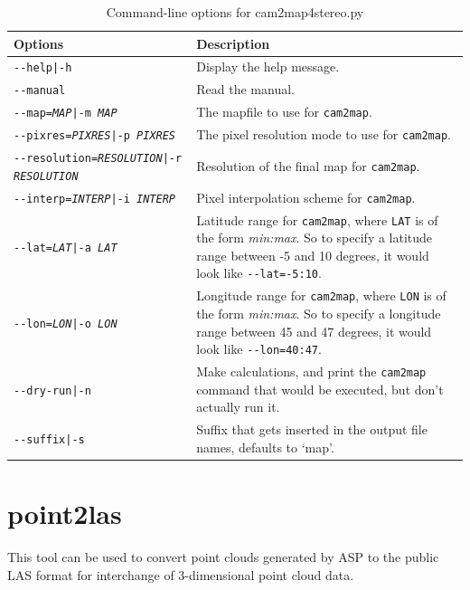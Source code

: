 \begin{longtable}{|l|p{10cm}|}
\caption{Command-line options for cam2map4stereo.py}
\label{tbl:bundlevis}
\endfirsthead
\endhead
\endfoot
\endlastfoot
\hline
Options & Description \\ \hline \hline
\texttt{-\/-help|-h} & Display the help message. \\ \hline
\texttt{-\/-manual} & Read the manual. \\ \hline
\texttt{-\/-map=\textit{MAP}|-m \textit{MAP}} & The mapfile to use for \texttt{cam2map}. \\ \hline
\texttt{-\/-pixres=\textit{PIXRES}|-p \textit{PIXRES}} & The pixel resolution mode to use for \texttt{cam2map}. \\ \hline
\texttt{-\/-resolution=\textit{RESOLUTION}|-r \textit{RESOLUTION}} & Resolution of the final map for \texttt{cam2map}. \\ \hline
\texttt{-\/-interp=\textit{INTERP}|-i \textit{INTERP}} & Pixel interpolation scheme for \texttt{cam2map}. \\ \hline
\texttt{-\/-lat=\textit{LAT}|-a \textit{LAT}} & Latitude range for \texttt{cam2map}, where \texttt{LAT} is of the form \textit{min:max}.  So to specify a latitude range between -5 and 10 degrees, it would look like \texttt{-\/-lat=-5:10}. \\ \hline
\texttt{-\/-lon=\textit{LON}|-o \textit{LON}} & Longitude range for \texttt{cam2map}, where \texttt{LON} is of the form \textit{min:max}.  So to specify a longitude range between 45 and 47 degrees, it would look like \texttt{-\/-lon=40:47}. \\ \hline
\texttt{-\/-dry-run|-n} & Make calculations, and print the \texttt{cam2map} command that would be executed, but don't actually run it.\\ \hline
\texttt{-\/-suffix|-s} & Suffix that gets inserted in the output file names, defaults to `map'.\\ \hline
\end{longtable}

\clearpage

\section{point2las}
\label{point2las}

This tool can be used to convert point clouds generated by ASP to the
public LAS format for interchange of 3-dimensional point cloud data.

